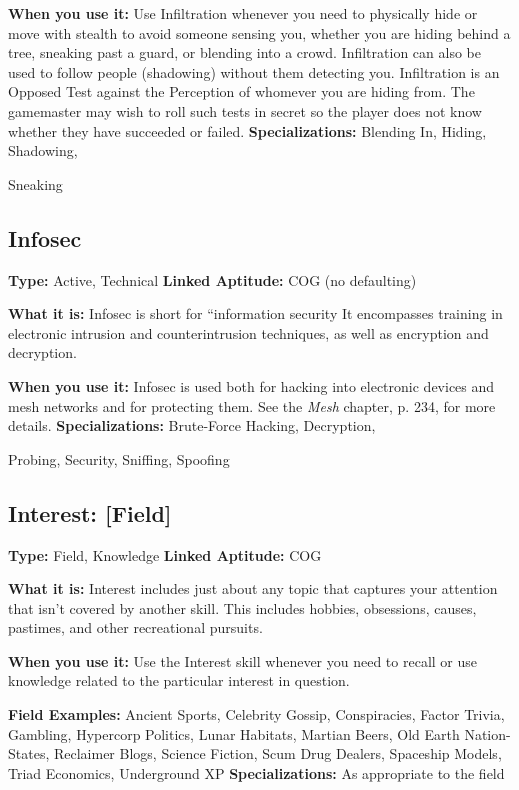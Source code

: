 \textbf{When you use it:} Use Infiltration whenever you 
need to physically hide or move with stealth to avoid 
someone sensing you, whether you are hiding behind 
a tree, sneaking past a guard, or blending into a 
crowd. Infiltration can also be used to follow people 
(shadowing) without them detecting you. Infiltration 
is an Opposed Test against the Perception of whomever
you are hiding from. The gamemaster may wish
to roll such tests in secret so the player does not know 
whether they have succeeded or failed.
\textbf{Specializations:} Blending In, Hiding, Shadowing, 

Sneaking

\subsection{Infosec}

\textbf{Type:} Active, Technical
\textbf{Linked Aptitude:} COG (no defaulting)

\textbf{What it is:} Infosec is short for ``information security
It encompasses training in electronic intrusion
and counterintrusion techniques, as well as encryption 
and decryption.

\textbf{When you use it:} Infosec is used both for hacking 
into electronic devices and mesh networks and for 
protecting them. See the \textit{Mesh} chapter, p. 234, for 
more details.
\textbf{Specializations:} Brute-Force Hacking, Decryption, 

Probing, Security, Sniffing, Spoofing

\subsection{Interest: [Field]}

\textbf{Type:} Field, Knowledge
\textbf{Linked Aptitude:} COG

\textbf{What it is:} Interest includes just about any topic 
that captures your attention that isn't covered by 
another skill. This includes hobbies, obsessions, 
causes, pastimes, and other recreational pursuits.

\textbf{When you use it:} Use the Interest skill whenever 
you need to recall or use knowledge related to the 
particular interest in question.

\textbf{Field Examples:} Ancient Sports, Celebrity Gossip, 
Conspiracies, Factor Trivia, Gambling, Hypercorp 
Politics, Lunar Habitats, Martian Beers, Old Earth 
Nation-States, Reclaimer Blogs, Science Fiction, Scum 
Drug Dealers, Spaceship Models, Triad Economics, 
Underground XP
\textbf{Specializations:} As appropriate to the field

